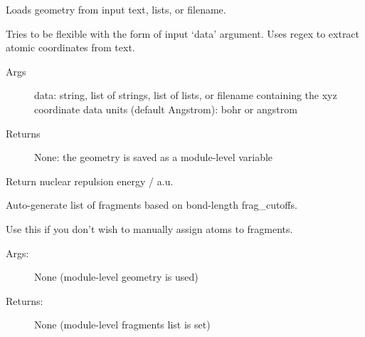 \documentclass[letterpaper,10pt,english]{sphinxmanual}
\begin{document}
\begin{fulllineitems}
\label{\detokenize{globals:Globals.geom.load_geometry}}
Loads geometry from input text, lists, or filename.

Tries to be flexible with the form of input `data' argument.
Uses regex to extract atomic coordinates from text.
\begin{description}
\item[{Args}] \leavevmode
data: string, list of strings, list of lists, or filename containing the
xyz coordinate data
units (default Angstrom): \sphinxquotedblleft{}bohr\sphinxquotedblright{} or \sphinxquotedblleft{}angstrom\sphinxquotedblright{}

\item[{Returns}] \leavevmode
None: the geometry is saved as a module-level variable

\end{description}

\end{fulllineitems}


\begin{fulllineitems}
\label{\detokenize{globals:Globals.geom.nuclear_repulsion_energy}}
Return nuclear repulsion energy / a.u.

\end{fulllineitems}


\begin{fulllineitems}
\label{\detokenize{globals:Globals.geom.set_frag_auto}}
Auto-generate list of fragments based on bond-length frag\_cutoffs.

Use this if you don't wish to manually assign atoms to fragments.
\begin{description}
\item[{Args:}] \leavevmode
None (module-level geometry is used)

\item[{Returns:}] \leavevmode
None (module-level fragments list is set)

\end{description}

\end{fulllineitems}
\end{document}
